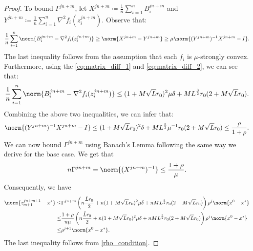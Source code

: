 \begin{proof}
    To bound $\Gamma^{j n + m}$, let $X^{j n + m} \coloneqq \frac{1}{n} \sum_{i=1}^n B_{i}^{j n + m}$ and $Y^{j n + m} \coloneqq \frac{1}{n} \sum_{i=1}^n \nabla^2 f_i (z_i^{j n + m})$. Observe that:
    \begin{equation*}
        \frac{1}{n} \sum_{i=1}^{n} \norm{B_i^{j n + m} - \nabla^2 f_i (z_i^{j n + m})} \geq \norm{X^{j n + m} - Y^{j n + m}} \geq \mu \norm{(Y^{j n + m})^{-1} X^{j n + m} - I}.
    \end{equation*}
    The last inequality follows from the assumption that each $f_i$ is $\mu$-strongly convex. Furthermore, using the \eqref{eq:matrix_diff_1} and \eqref{eq:matrix_diff_2}, we can see that:
    \begin{equation*}
         \frac{1}{n} \sum_{i=1}^{n} \norm{B_i^{j n + m} - \nabla^2 f_i (z_i^{j n + m})} \leq   (1 + M \sqrt{L} r_0 )^2 \mu \delta  +  M L^{\frac{3}{2}} r_0  (2 + M \sqrt{L} r_0 ).
    \end{equation*}
    Combining the above two inequalities, we can infer that:
    \begin{equation*}
        \norm{(Y^{j n + m})^{-1} X^{j n + m} - I} \leq  (1 + M \sqrt{L} r_0 )^2 \delta  +  M L^{\frac{3}{2}} \mu^{-1} r_0  (2 + M \sqrt{L} r_0 ) \leq \frac{\rho}{1 + \rho}.
    \end{equation*}
    We can now bound $\Gamma^{j n + m}$ using Banach's Lemma following the same way we derive for the base case. We get that 
    \begin{equation*}
        n \Gamma^{j n + m} =  \norm{(X^{j n + m})^{-1}} \leq \frac{1 + \rho}{\mu}.
    \end{equation*}
    Consequently, we have
    \begin{equation}
          \begin{split}
         \norm{z_{m+1}^{j n + m + 1} - x^*} 
        \leq & \Gamma^{j n + m}\left( n \frac{\Tilde{L} r_0 }{ 2} + n (1 + M \sqrt{L} r_0 )^2 \mu \delta  + n M L^{\frac{3}{2}} r_0  (2 + M \sqrt{L} r_0 ) \right) \rho^j \norm{x^0 - x^*} \\
        \leq & \frac{1 + \rho}{n \mu} \left( n \frac{\Tilde{L} r_0 }{ 2} + n (1 + M \sqrt{L} r_0 )^2 \mu \delta  + n M L^{\frac{3}{2}} r_0  (2 + M \sqrt{L} r_0 ) \right) \rho^j \norm{x^0 - x^*} \\
        \leq & \rho^{j + 1} \norm{x^0 - x^*}.
    \end{split}
    \label{stage_2_upper_bound}
    \end{equation}
    The last inequality follows from \eqref{rho_condition}.


\end{proof}
